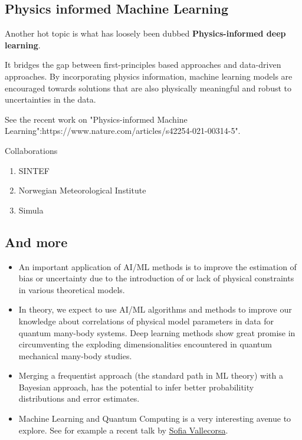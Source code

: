 \documentclass[%
oneside,                 %
final,                   %
10pt]{article}
\begin{document}
\vspace{6mm}

\subsection{Physics informed Machine Learning}

Another hot topic is what has loosely been dubbed \textbf{Physics-informed  deep learning}.

It bridges the gap between first-principles based approaches and
data-driven approaches. By incorporating physics information, machine
learning models are encouraged towards solutions that are also
physically meaningful and robust to uncertainties in the data.

See the recent work on "Physics-informed Machine Learning":https://www.nature.com/articles/s42254-021-00314-5".

\begin{block}{Collaborations  }
\begin{enumerate}
\item SINTEF

\item Norwegian Meteorological Institute

\item Simula
\end{enumerate}

\noindent
\end{block}

\subsection{And more}

\begin{block}{}
\begin{itemize}
\item An important application of AI/ML methods is to improve the estimation of bias or uncertainty due to the introduction of or lack of physical constraints in various theoretical models.

\item In theory, we expect to use AI/ML algorithms and methods to improve our knowledge about  correlations of physical model parameters in data for quantum many-body systems. Deep learning methods show great promise in circumventing the exploding dimensionalities encountered in quantum mechanical many-body studies. 

\item Merging a frequentist approach (the standard path in ML theory) with a Bayesian approach, has the potential to infer better probabilitity distributions and error estimates. 

\item Machine Learning and Quantum Computing is a very interesting avenue to explore. See for example a recent talk by \href{{https://www.youtube.com/watch?v=7WPKv1Q57os&list=PLUPPQ1TVXK7uHwCTccWMBud-zLyvAf8A2&index=5&ab_channel=ECTstar}}{Sofia Vallecorsa}.
\end{itemize}

\noindent
\end{block}
\end{document}
